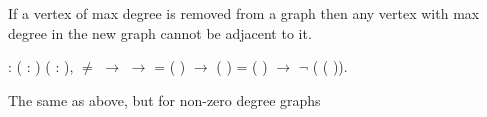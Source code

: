  If a vertex of max degree is removed from a graph then any vertex
    with max degree in the new graph cannot be adjacent to it.
\begin{coqdoccode}
\coqdocemptyline
\coqdocnoindent
{}  : \coqdockw{\ensuremath{\forall}} ( : ) (  : ),\coqdoceol
\coqdocindent{2.00em}
 \ensuremath{\not=}  \ensuremath{\rightarrow}\coqdoceol
\coqdocindent{2.00em}
   \ensuremath{\rightarrow}\coqdoceol
\coqdocindent{2.00em}
   =  ( ) \ensuremath{\rightarrow}\coqdoceol
\coqdocindent{2.00em}
  (  ) =  ( ) \ensuremath{\rightarrow}\coqdoceol
\coqdocindent{2.00em}
\ensuremath{\lnot} (  (  )).\coqdoceol
\coqdocemptyline
\end{coqdoccode}
The same as above, but for non-zero degree graphs
